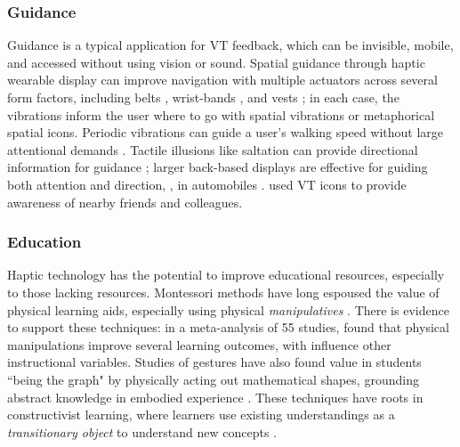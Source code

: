 \subsubsection{Guidance}
Guidance is a typical application for VT feedback, which can be invisible, mobile, and accessed without using vision or sound.
Spatial guidance through haptic wearable display can improve navigation with multiple actuators across several form factors, including belts \cite{Pielot2009,Lindeman2005}, wrist-bands \cite{Arab2015}, and vests \cite{Prasad2014}; in each case, the vibrations inform the user where to go with spatial vibrations or metaphorical spatial icons.
Periodic vibrations can guide a user's walking speed without large attentional demands \cite{Karuei2014}.
Tactile illusions like saltation can provide directional information for guidance \cite{Tan1997}; larger back-based displays are effective for guiding both attention and direction, \eg, in automobiles \cite{Tan2003}.
\citet{Brewster2010} used VT icons to provide awareness of nearby friends and colleagues.





\subsubsection{Education}
Haptic technology has the potential to improve educational resources, especially to those lacking resources.
Montessori methods have long espoused the value of physical learning aids, especially using physical \emph{manipulatives} \cite{Montessori1917}.
There is evidence to support these techniques: in a meta-analysis of 55 studies, \citet{Carbonneau2013} found that physical manipulations improve several learning outcomes, with influence  other instructional variables.
Studies of gestures have also found value in students ``being the graph" by physically acting out mathematical shapes, grounding abstract knowledge in embodied experience \cite{Gerofsky2010}.
These techniques have roots in constructivist learning, where learners use existing understandings as a \emph{transitionary object} to understand new concepts \cite{Papert1980}.


